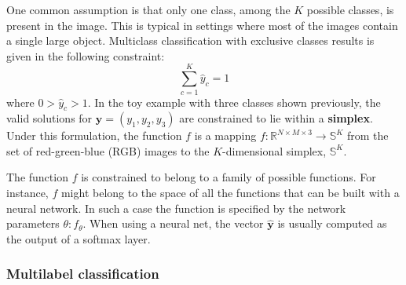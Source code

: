 One common assumption is that only one class, among the $K$ possible classes, is present in the image. This is typical in settings where most of the images contain a single large object.
Multiclass classification with exclusive classes results is given in the following constraint:
\begin{equation}
    \sum_{c=1}^K \hat{y}_c=1
\end{equation}
where $0>\hat{y}_c>1$.
In the toy example with three classes shown previously, the valid solutions for $\mathbf{y}=(y_1, y_2, y_3)$ are constrained to lie within a \textbf{simplex}.
Under this formulation, the function $f$ is a mapping $f:\mathbb{R}^{N \times M \times 3} \rightarrow \mathbb{S}^K$ from the set of red-green-blue (RGB) images to the $K$-dimensional simplex, $\mathbb{S}^K$.


The function $f$ is constrained to belong to a family of possible functions. For instance, $f$ might belong to the space of all the functions that can be built with a neural network. In such a case the function is specified by the network parameters $\theta: f_\theta$. When using a neural net, the vector $\hat{\mathbf{y}}$ is usually computed as the output of a softmax layer.

\subsubsection{Multilabel classification}

